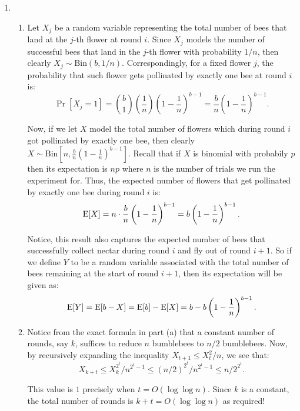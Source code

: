 \documentclass[10pt, letterpaper]{article}
\begin{document}
\begin{enumerate}[label={\bfseries Q\arabic*.}]
  \item
    \begin{enumerate}
      \item
        Let $X_j$ be a random variable representing the total number of bees that land at the
        $j$-th flower at round $i$. Since $X_j$ models the number of successful bees that land
        in the $j$-th flower with probability $1/n$, then clearly $X_j \sim \text{Bin}(b, 1/n)$.
        Correspondingly, for a fixed flower $j$, the probability that such flower gets pollinated
        by exactly one bee at round $i$ is:
        \[
          \Pr[X_j = 1] = {b \choose 1} \left(\frac{1}{n}\right) \left(1-\frac{1}{n}\right)^{b-1}
                       = \frac{b}{n} \left(1-\frac{1}{n}\right)^{b-1}.
        \]
        
        Now, if we let $X$ model the total number of flowers which during round $i$ got pollinated
        by exactly one bee, then clearly $X \sim \text{Bin}\left[n, \frac{b}{n} \left( 1 - \frac{1}{n}\right)^{b-1}\right]$.
        Recall that if $X$ is binomial with probabily $p$ then its expectation is $np$ where $n$ is
        the number of trials we run the experiment for. Thus, the expected number of flowers that
        get pollinated by exactly one bee during round $i$ is:
        \[
          \mathrm{E}[X] = n \cdot \frac{b}{n} \left(1-\frac{1}{n}\right)^{b-1} = b \left(1-\frac{1}{n}\right)^{b-1}.
        \]

        Notice, this result also captures the expected number of bees that successfully collect nectar
        during round $i$ and fly out of round $i+1$. So if we define $Y$ to be a random variable associated
        with the total number of bees remaining at the start of round $i+1$, then its expectation will
        be given as:
        \[ 
          \mathrm{E}[Y] = \mathrm{E}[b - X] = \mathrm{E}[b] - \mathrm{E}[X] = b - b \left(1-\frac{1}{n}\right)^{b-1}.
        \]

      \item
        Notice from the exact formula in part (a) that a constant number of rounds, say $k$, suffices to
        reduce $n$ bumblebees to $n/2$ bumblebees. Now, by recursively expanding the inequality $X_{t+1} \leq
        X_t^2/n$, we see that:
        \[
          X_{k+t} \leq X_k^{2^t}/n^{2^t-1} \leq (n/2)^{2^t}/n^{2^t-1} \leq n/2^{2^t}.
        \]
        
        This value is $1$ precisely when $t = O(\log \log n)$. Since $k$ is a constant, the total number
        of rounds is $k + t = O(\log \log n)$ as required!
    \end{enumerate}


\end{enumerate}
\end{document}
